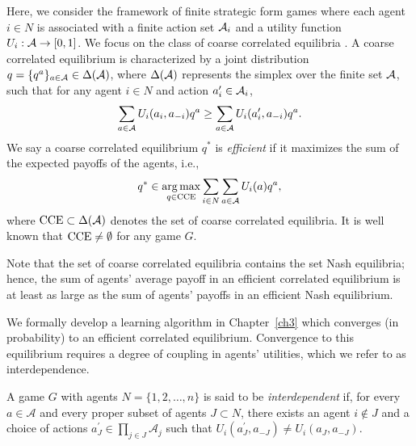 \bigskip


Here, we consider the framework of finite strategic form games where each agent $i \in N$ is associated with a finite action set ${\cal A}_i$ and a utility function $U_i : {\cal A} \rightarrow [0,1]$.
%
%
We focus on the class of coarse correlated equilibria \cite{Aumann1987}.  A coarse correlated equilibrium is characterized by a joint distribution $q = \{q^a\}_{a \in {\cal A}} \in \Delta({\cal A})$, where $\Delta({\cal A})$ represents the simplex over the finite set ${\cal A}$, such that for any agent $i \in N$ and action $a_i' \in {\cal A}_i$,
%
\begin{equation} 
\sum_{a \in {\cal A}} U_i(a_i, a_{-i}) q^a \geq \sum_{a \in {\cal A}} U_i(a_i', a_{-i}) q^a.
\end{equation}
%
We say a coarse correlated equilibrium $q^*$ is {\it efficient} if it maximizes the sum of the expected payoffs of the agents, i.e., 
%
\begin{equation}
%
q^* \in \underset{q \in {\rm CCE}}{\arg \max} \sum_{i \in N} \sum_{a \in \aee} U_i(a) q^a,
%
\end{equation}  
%
where ${\rm CCE} \subset \Delta({\cal A})$ denotes the set of coarse correlated equilibria.  It is well known that ${\rm CCE} \neq \emptyset$ for any game $G$.

Note that the set of coarse correlated equilibria contains the set Nash equilibria; hence, the sum of agents' average payoff in an efficient correlated equilibrium is at least as large as the sum of agents' payoffs in an efficient Nash equilibrium.

We formally develop a learning algorithm in Chapter~\ref{ch3} which converges (in probability) to an efficient correlated equilibrium. Convergence to this equilibrium requires a degree of coupling in agents' utilities, which we refer to as interdependence.


\begin{defn}
A game $G$ with agents $N = \{1,2,\ldots,n\}$ is said to be {\it interdependent} if, for every $a\in\mathcal{A}$ and every proper subset of agents $J\subset N$, there exists an agent $i\notin J$ and a choice of actions $a_J^\prime\in\prod_{j\in J} \mathcal{A}_j$ such that $U_i(a_J^\prime,a_{-J})\neq U_i(a_J,a_{-J}).$
\end{defn}

